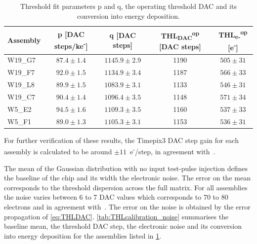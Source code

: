\begin{table}[htbp]
  \centering
  \caption{Threshold fit parameters p and q, the operating threshold
    DAC and its conversion into energy deposition.}
  \label{tab:THLcalibration}
  \begin{tabular}{lcccc}
    \toprule
    Assembly & p [DAC steps/ke\textsuperscript{-}] & q [DAC steps] & THL\textsubscript{DAC}\textsuperscript{op} [DAC steps] & THL\textsubscript{e-}\textsuperscript{op} [e\textsuperscript{-}] \\
    \midrule
    W19\_G7 & $87.4\pm1.4$ & $1145.9\pm2.9$ & 1190 & $505\pm31$ \\
    W19\_F7 & $92.0\pm1.5$ & $1134.9\pm3.4$ & 1187 & $566\pm33$ \\
    W19\_L8 & $89.9\pm1.5$ & $1083.9\pm3.1$ & 1133 & $546\pm31$ \\
    W19\_C7 & $90.4\pm1.4$ & $1096.4\pm3.5$ & 1148 & $571\pm34$ \\
    W5\_E2  & $94.5\pm1.6$ & $1109.3\pm3.5$ & 1160 & $537\pm33$ \\
    W5\_F1  & $89.0\pm1.3$ & $1105.3\pm3.1$ & 1153 & $536\pm31$ \\
    \bottomrule
  \end{tabular}
\end{table}



For further verification of these results, the Timepix3 DAC step gain
for each assembly is calculated to be around
$\pm11$~e\textsuperscript{-}/step, in agreement
with~\cite{Timepix3Poikela}.

The mean of the Gaussian distribution with no input test-pulse
injection defines the baseline of the chip and its width the
electronic noise. The error on the mean corresponds to the threshold
dispersion across the full matrix. For all assemblies the noise varies
between 6 to 7 DAC values which corresponds to 70 to 80 electrons and
in agreement with~\cite{art:tmpx}. The error on the noise is obtained
by the error propagation of
\cref{eq:THLDAC}. \cref{tab:THLcalibration_noise} summarises the
baseline mean, the threshold DAC step, the electronic noise and its
conversion into energy deposition for the assemblies listed in
\cref{tab:THLcalibration}.



